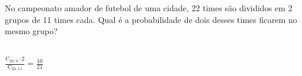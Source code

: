 \begin{ex}
No campeonato amador de futebol de uma cidade, 22 times são divididos em 2 grupos de 11 times cada. Qual é a probabilidade de dois desses times ficarem no mesmo grupo?
 \begin{sol}
   \phantom{A} \\
   $\frac{\mathrm{C}_{{20},9}\cdot2}{\mathrm{C}_{{22},{11}}}=\frac{10}{21}$
 \end{sol}
\end{ex}
